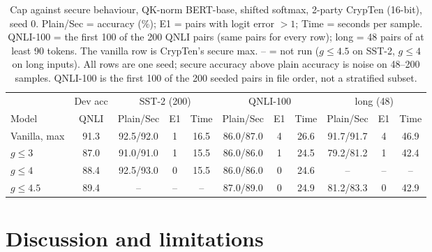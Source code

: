 \documentclass[11pt]{article}
\begin{document}
\begin{table}[tbp]\centering\footnotesize\setlength{\tabcolsep}{3pt}
\caption{Cap against secure behaviour, QK-norm BERT-base, shifted softmax, 2-party CrypTen (16-bit), seed 0. Plain/Sec = accuracy (\%); E1 = pairs with logit error $>1$; Time = seconds per sample. QNLI-100 = the first 100 of the 200 QNLI pairs (same pairs for every row); long = 48 pairs of at least 90 tokens. The vanilla row is CrypTen's secure max. -- = not run ($g\le4.5$ on SST-2, $g\le4$ on long inputs). All rows are one seed; secure accuracy above plain accuracy is noise on 48--200 samples. QNLI-100 is the first 100 of the 200 seeded pairs in file order, not a stratified subset.}\label{tab:cap}
\begin{tabular}{@{}lcccccccccc@{}}\toprule
 & Dev acc & \multicolumn{3}{c}{SST-2 (200)} & \multicolumn{3}{c}{QNLI-100} & \multicolumn{3}{c}{long (48)}\\
Model & QNLI & Plain/Sec & E1 & Time & Plain/Sec & E1 & Time & Plain/Sec & E1 & Time\\\midrule
Vanilla, max & 91.3 & 92.5/92.0 & 1 & 16.5 & 86.0/87.0 & 4 & 26.6 & 91.7/91.7 & 4 & 46.9\\
$g\le3$ & 87.0 & 91.0/91.0 & 1 & 15.5 & 86.0/86.0 & 1 & 24.5 & 79.2/81.2 & 1 & 42.4\\
$g\le4$ & 88.4 & 92.5/93.0 & 0 & 15.5 & 86.0/86.0 & 0 & 24.6 & -- & -- & --\\
$g\le4.5$ & 89.4 & -- & -- & -- & 87.0/89.0 & 0 & 24.9 & 81.2/83.3 & 0 & 42.9\\\bottomrule
\end{tabular}
\end{table}

\section{Discussion and limitations}
\end{document}
